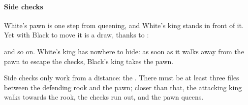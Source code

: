 \paragraph{Side checks}


White's pawn is one step from queening, and White's king stands in front of it. Yet with Black
to move it is a draw, thanks to
:


and so on. White's king has nowhere to hide: as soon as it walks away from the pawn to escape
the checks, Black's king takes the pawn.

Side checks only work from a distance: the
. There must be at least
three files between the defending rook and the pawn; closer than that, the attacking king walks towards the rook,
the checks run out, and the pawn queens.
